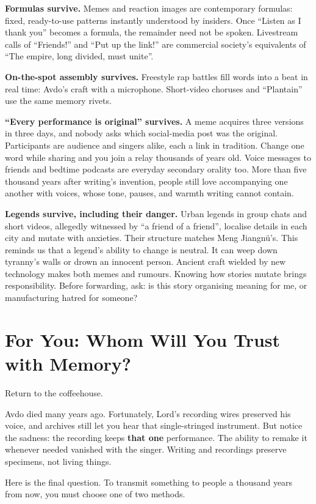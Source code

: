 \textbf{Formulas survive.} Memes and reaction images are contemporary formulas: fixed, ready-to-use patterns instantly understood by insiders. Once ``Listen as I thank you'' becomes a formula, the remainder need not be spoken. Livestream calls of ``Friends!'' and ``Put up the link!'' are commercial society's equivalents of ``The empire, long divided, must unite''.

\textbf{On-the-spot assembly survives.} Freestyle rap battles fill words into a beat in real time: Avdo's craft with a microphone. Short-video choruses and ``Plantain'' use the same memory rivets.

\textbf{``Every performance is original'' survives.} A meme acquires three versions in three days, and nobody asks which social-media post was the original. Participants are audience and singers alike, each a link in tradition. Change one word while sharing and you join a relay thousands of years old. Voice messages to friends and bedtime podcasts are everyday secondary orality too. More than five thousand years after writing's invention, people still love accompanying one another with voices, whose tone, pauses, and warmth writing cannot contain.

\textbf{Legends survive, including their danger.} Urban legends in group chats and short videos, allegedly witnessed by ``a friend of a friend'', localise details in each city and mutate with anxieties. Their structure matches Meng Jiangnü's. This reminds us that a legend's ability to change is neutral. It can weep down tyranny's walls or drown an innocent person. Ancient craft wielded by new technology makes both memes and rumours. Knowing how stories mutate brings responsibility. Before forwarding, ask: is this story organising meaning for me, or manufacturing hatred for someone?

\section{For You: Whom Will You Trust with Memory?}
Return to the coffeehouse.

Avdo died many years ago. Fortunately, Lord's recording wires preserved his voice, and archives still let you hear that single-stringed instrument. But notice the sadness: the recording keeps \textbf{that one} performance. The ability to remake it whenever needed vanished with the singer. Writing and recordings preserve specimens, not living things.

Here is the final question. To transmit something to people a thousand years from now, you must choose one of two methods.


